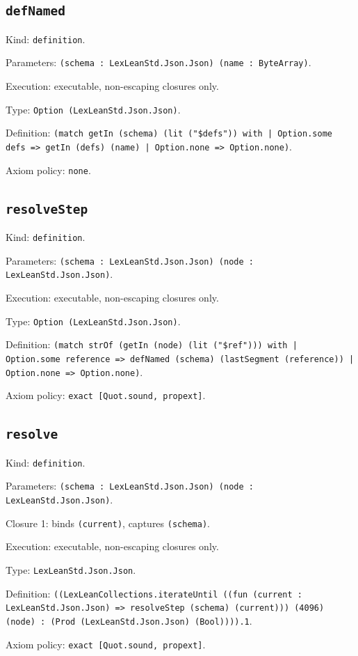 \documentclass[11pt]{article}
\begin{document}
\subsection*{\texttt{defNamed}}
\noindent Kind: \texttt{definition}.\par
\noindent Parameters: \texttt{(schema : LexLeanStd.Json.Json) (name : ByteArray)}.\par
\noindent Execution: executable, non-escaping closures only.\par
\noindent Type: \texttt{Option (LexLeanStd.Json.Json)}.\par
\noindent Definition: \texttt{(match getIn (schema) (lit ("\$defs")) with | Option.some defs => getIn (defs) (name) | Option.none => Option.none)}.\par
\noindent Axiom policy: \texttt{none}.\par
\subsection*{\texttt{resolveStep}}
\noindent Kind: \texttt{definition}.\par
\noindent Parameters: \texttt{(schema : LexLeanStd.Json.Json) (node : LexLeanStd.Json.Json)}.\par
\noindent Execution: executable, non-escaping closures only.\par
\noindent Type: \texttt{Option (LexLeanStd.Json.Json)}.\par
\noindent Definition: \texttt{(match strOf (getIn (node) (lit ("\$ref"))) with | Option.some reference => defNamed (schema) (lastSegment (reference)) | Option.none => Option.none)}.\par
\noindent Axiom policy: \texttt{exact [Quot.sound, propext]}.\par
\subsection*{\texttt{resolve}}
\noindent Kind: \texttt{definition}.\par
\noindent Parameters: \texttt{(schema : LexLeanStd.Json.Json) (node : LexLeanStd.Json.Json)}.\par
\noindent Closure 1: binds \texttt{(current)}, captures \texttt{(schema)}.\par
\noindent Execution: executable, non-escaping closures only.\par
\noindent Type: \texttt{LexLeanStd.Json.Json}.\par
\noindent Definition: \texttt{((LexLeanCollections.iterateUntil ((fun (current : LexLeanStd.Json.Json) => resolveStep (schema) (current))) (4096) (node) : (Prod (LexLeanStd.Json.Json) (Bool)))).1}.\par
\noindent Axiom policy: \texttt{exact [Quot.sound, propext]}.\par
\end{document}

